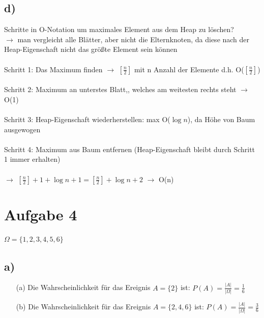 \documentclass[enabledeprecatedfontcommands, a4paper]{scrartcl}
\begin{document}
\subsection*{d)}

Schritte in O-Notation um maximales Element aus dem Heap zu löschen?
\\
$\rightarrow$ man vergleicht alle Blätter, aber nicht die Elternknoten, da diese nach der Heap-Eigenschaft nicht das größte Element sein können
\\
\\
Schritt 1: Das Maximum finden $\rightarrow$  $[\frac{n}{2}]$ mit n Anzahl der Elemente d.h. O($[\frac{n}{2}]$)
\\
\\
Schritt 2: Maximum an unterstes Blatt,, welches am weitesten rechts steht $\rightarrow$ O(1)
\\
\\
Schritt 3: Heap-Eigenschaft wiederherstellen: max O($\log n$), da Höhe von Baum ausgewogen
\\
\\
Schritt 4: Maximum aus Baum entfernen (Heap-Eigenschaft bleibt durch Schritt 1 immer erhalten) 
\\
\\
$\rightarrow$ $[\frac{n}{2}] + 1 + \log n + 1 = [\frac{n}{2}] +\log n + 2$ $\rightarrow$ O(n)
\newpage
\section*{Aufgabe 4}
$\Omega = \{1, 2, 3, 4, 5, 6\}$
\subsection*{a)}
\begin{itemize}
\item[(a)] 
Die Wahrscheinlichkeit für das Ereignis $A=\{2\}$ ist: $P(A)=\frac{|A|}{|\Omega|}=\frac{1}{6}$
\item[(b)]
Die Wahrscheinlichkeit für das Ereignis $A=\{2, 4, 6\}$ ist: $P(A)=\frac{|A|}{|\Omega|}=\frac{3}{6}$
\end{itemize}
\end{document}
